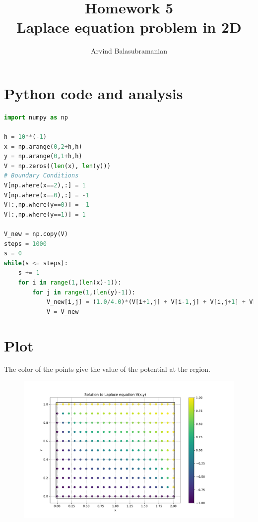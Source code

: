 \documentclass[a4paper,10pt]{article}
\title{Homework 5 \\
\textbf{Laplace equation problem in 2D}}
\author{Arvind Balasubramanian}
\date{}
\begin{document}
\maketitle
\section*{Python code and analysis}
\begin{lstlisting}[language=python]
import numpy as np

h = 10**(-1)
x = np.arange(0,2+h,h)
y = np.arange(0,1+h,h)
V = np.zeros((len(x), len(y)))
# Boundary Conditions
V[np.where(x==2),:] = 1
V[np.where(x==0),:] = -1
V[:,np.where(y==0)] = -1
V[:,np.where(y==1)] = 1

V_new = np.copy(V)
steps = 1000
s = 0
while(s <= steps):
    s += 1
    for i in range(1,(len(x)-1)):
        for j in range(1,(len(y)-1)):
            V_new[i,j] = (1.0/4.0)*(V[i+1,j] + V[i-1,j] + V[i,j+1] + V[i,j-1])
            V = V_new
\end{lstlisting}

\section*{Plot}
The color of the points give the value of the potential at the region.
\begin{figure}[H]
\centering
\includegraphics[scale=0.6]{solution} 
\end{figure}
\end{document}
